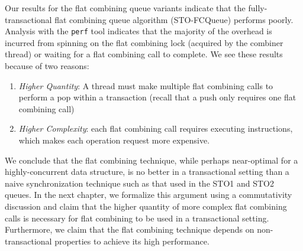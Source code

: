 Our results for the flat combining queue variants indicate that the fully-transactional flat combining queue algorithm (STO-FCQueue) performs poorly. Analysis with the \texttt{perf} tool indicates that the majority of the overhead is incurred from spinning on the flat combining lock (acquired by the combiner thread) or waiting for a flat combining call to complete. We see these results because of two reasons:
\begin{enumerate}
\item \emph{Higher Quantity}: A thread must make multiple flat combining calls to perform a pop within a transaction (recall that a push only requires one flat combining call) 
\item \emph{Higher Complexity}: each flat combining call requires executing instructions, which makes each operation request more expensive.
\end{enumerate}

We conclude that the flat combining technique, while perhaps near-optimal for a highly-concurrent data structure, is no better in a transactional setting than a naive synchronization technique such as that used in the STO1 and STO2 queues. In the next chapter, we formalize this argument using a commutativity discussion and claim that the higher quantity of more complex flat combining calls is necessary for flat combining to be used in a transactional setting. Furthermore, we claim that the flat combining technique depends on non-transactional properties to achieve its high performance. 
